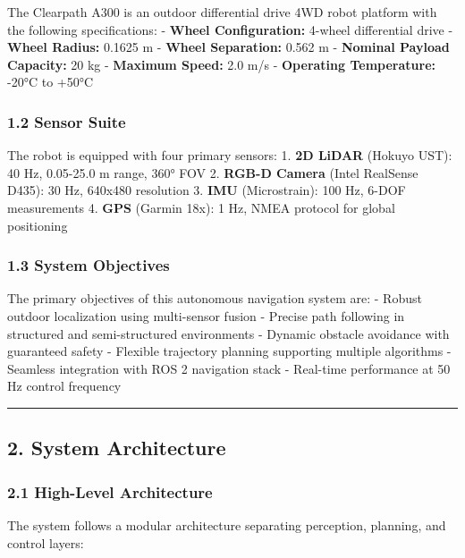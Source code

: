 The Clearpath A300 is an outdoor differential drive 4WD robot platform
with the following specifications: - \textbf{Wheel Configuration:}
4-wheel differential drive - \textbf{Wheel Radius:} 0.1625 m -
\textbf{Wheel Separation:} 0.562 m - \textbf{Nominal Payload Capacity:}
20 kg - \textbf{Maximum Speed:} 2.0 m/s - \textbf{Operating
Temperature:} -20°C to +50°C

\hypertarget{sensor-suite}{%
\subsubsection{1.2 Sensor Suite}\label{sensor-suite}}

The robot is equipped with four primary sensors: 1. \textbf{2D LiDAR}
(Hokuyo UST): 40 Hz, 0.05-25.0 m range, 360° FOV 2. \textbf{RGB-D
Camera} (Intel RealSense D435): 30 Hz, 640x480 resolution 3.
\textbf{IMU} (Microstrain): 100 Hz, 6-DOF measurements 4. \textbf{GPS}
(Garmin 18x): 1 Hz, NMEA protocol for global positioning

\hypertarget{system-objectives}{%
\subsubsection{1.3 System Objectives}\label{system-objectives}}

The primary objectives of this autonomous navigation system are: -
Robust outdoor localization using multi-sensor fusion - Precise path
following in structured and semi-structured environments - Dynamic
obstacle avoidance with guaranteed safety - Flexible trajectory planning
supporting multiple algorithms - Seamless integration with ROS 2
navigation stack - Real-time performance at 50 Hz control frequency

\begin{center}\rule{0.5\linewidth}{0.5pt}\end{center}

\hypertarget{system-architecture}{%
\subsection{2. System Architecture}\label{system-architecture}}

\hypertarget{high-level-architecture}{%
\subsubsection{2.1 High-Level
Architecture}\label{high-level-architecture}}

The system follows a modular architecture separating perception,
planning, and control layers:

